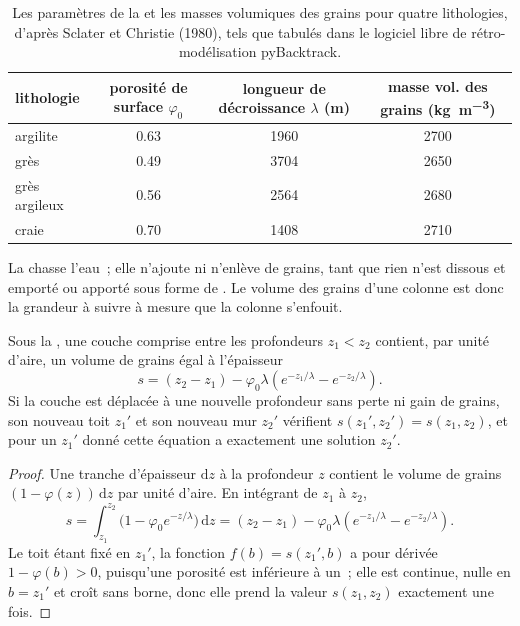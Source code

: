 \begin{table}[htbp]
\centering\small
\begin{tabular}{lccc}
\hline
lithologie & porosité de surface $\varphi_0$ & longueur de décroissance $\lambda$ (m) & masse vol. des grains (\unit{kg.m^{-3}}) \\
\hline
argilite          & 0.63 & 1960 & 2700 \\
grès              & 0.49 & 3704 & 2650 \\
grès argileux     & 0.56 & 2564 & 2680 \\
craie             & 0.70 & 1408 & 2710 \\
\hline
\end{tabular}
\caption{Les paramètres de la  et les masses volumiques des grains pour quatre
lithologies, d'après Sclater et Christie (1980), tels que tabulés dans le logiciel libre de
rétro-modélisation pyBacktrack.}
\label{tab:b1:diagenesis-basins:athy}
\end{table}

La  chasse l'eau~; elle n'ajoute ni n'enlève de grains, tant
que rien n'est dissous et emporté ou apporté sous forme de . Le volume
des grains d'une colonne est donc la grandeur à suivre à mesure que la colonne
s'enfouit.

\begin{proposition}\label{prop:b1:diagenesis-basins:solid}
Sous la , une couche comprise entre les profondeurs $z_1 < z_2$ contient, par unité d'aire, un
volume de grains égal à l'épaisseur
\[
  s = (z_2 - z_1) - \varphi_0 \lambda \left( e^{-z_1/\lambda} - e^{-z_2/\lambda} \right).
\]
Si la couche est déplacée à une nouvelle profondeur sans perte ni gain de grains, son nouveau toit
$z_1'$ et son nouveau mur $z_2'$ vérifient $s(z_1', z_2') = s(z_1, z_2)$, et pour un
$z_1'$ donné cette équation a exactement une solution $z_2'$.
\end{proposition}

\begin{proof}
Une tranche d'épaisseur $\mathrm dz$ à la profondeur $z$ contient le volume de grains
$(1 - \varphi(z))\,\mathrm dz$ par unité d'aire. En intégrant de $z_1$ à $z_2$,
\[
  s = \int_{z_1}^{z_2} \bigl(1 - \varphi_0 e^{-z/\lambda}\bigr)\,\mathrm dz
    = (z_2 - z_1) - \varphi_0\lambda\left(e^{-z_1/\lambda} - e^{-z_2/\lambda}\right).
\]
Le toit étant fixé en $z_1'$, la fonction $f(b) = s(z_1', b)$ a pour
dérivée $1 - \varphi(b) > 0$, puisqu'une porosité est inférieure à un~; elle est
continue, nulle en $b = z_1'$ et croît sans borne, donc elle prend la valeur
$s(z_1, z_2)$ exactement une fois.
\end{proof}

